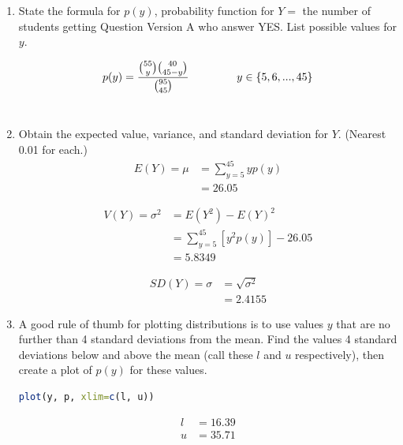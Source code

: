 \documentclass{scrartcl}
\begin{document}
\begin{enumerate}

\item State the formula for $p(y)$, probability function for $Y = $ the number of students getting Question Version A who answer YES. List possible values for $y$.

$$p(y) = \frac{{55 \choose y}{40 \choose 45-y}}{{95 \choose 45}} \text{\hspace{.6in}} y \in \{5, 6, ..., 45\}$$\\

\item Obtain the expected value, variance, and standard deviation for $Y$. (Nearest 0.01 for each.)\\

\begin{align*}
  E(Y) = \mu &= \sum_{y=5}^{45}yp(y)\\
  &= 26.05
\end{align*}

\begin{align*}
  V(Y) = \sigma^2 &= E(Y^2) - E(Y)^2\\
  &= \sum_{y=5}^{45}\left[y^2p(y)\right] - 26.05\\
  &= 5.8349
\end{align*}

\begin{align*}
  SD(Y) = \sigma &= \sqrt{\sigma^2}\\
  &= 2.4155
\end{align*}
\pagebreak

\item A good rule of thumb for plotting distributions is to use values $y$ that are no further than 4 standard deviations from the mean. Find the values 4 standard deviations below and above the mean (call these $l$ and $u$ respectively), then create a plot of $p(y)$ for these values.

\begin{lstlisting}[language=R]
  plot(y, p, xlim=c(l, u))
\end{lstlisting}

\begin{align*}
  l &= 16.39\\
  u &= 35.71
\end{align*}


\end{enumerate}
\end{document}
